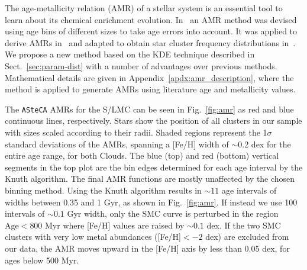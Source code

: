 \documentclass[draft]{aa}
\begin{document}
The age-metallicity relation (AMR) of a stellar system is an essential tool to learn
about its chemical enrichment evolution.
%
In~\cite{Piatti_2010_AMR} an AMR method was devised using age bins of different
sizes to take age errors into account. It was applied to derive AMRs
in~\cite{Piatti_Geisler_2013} and adapted to obtain star cluster frequency
distributions in~\cite{Piatti_2013_CF}.
%
We propose a new method based on the KDE technique described in
Sect.~\ref{sec:param-dist} with a number of advantages over previous methods.
Mathematical details are given in Appendix~\ref{apdx:amr_description}, where
the method is applied to generate AMRs using literature age and metallicity
values.

The \texttt{ASteCA} AMRs for the S/LMC can be seen in Fig.~\ref{fig:amr} as red
and blue continuous lines, respectively. Stars show the position of all clusters
in our sample with sizes scaled according to their radii.
%
Shaded regions represent the 1$\sigma$ standard deviations of the AMRs, spanning
a [Fe/H] width of ${\sim}0.2$ dex for the entire age range, for both Clouds.
The blue (top) and red (bottom) vertical segments in the top plot are the bin
edges determined for each age interval by the Knuth algorithm.
%
The final AMR functions are mostly unaffected by the chosen binning method.
Using the Knuth algorithm results in ${\sim}11$ age intervals of widths between
0.35 and 1 Gyr, as shown in Fig.~\ref{fig:amr}. If instead we use 100 intervals
of ${\sim}0.1$ Gyr width, only the SMC curve is perturbed in the region
$\mathrm{Age}{<800}$ Myr where [Fe/H] values are raised by ${\sim}0.1$ dex.
%
%
If the two SMC clusters with very low metal abundances ([Fe/H]${<-}2$ dex) are
excluded from our data, the AMR moves upward in the [Fe/H] axis by less than
0.05 dex, for ages below 500 Myr.
\end{document}
